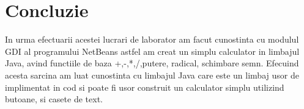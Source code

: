 \section{Concluzie}
In urma efectuarii acestei lucrari de laborator am facut cunostinta cu modulul GDI al programului NetBeans astfel am creat un simplu calculator in limbajul Java, avind functiile de baza +,-,*,/,putere, radical, schimbare semn. Efecuind acesta sarcina am luat cunostinta cu limbajul Java care este un limbaj usor de implimentat in cod si poate fi usor construit un calculator simplu utilizind butoane, si casete de text.

